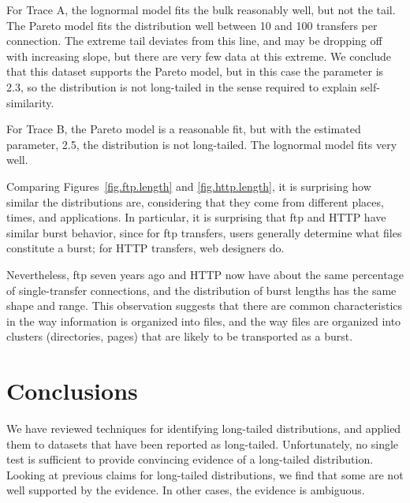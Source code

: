 \documentclass{elsart}
\begin{document}
For Trace A, the lognormal model fits the bulk
reasonably well, but not the tail.
The Pareto model fits the distribution well between 10
and 100 transfers per connection.  The extreme tail deviates from this
line, and may be dropping off with increasing slope, but there are
very few data at this extreme.  We conclude that this dataset
supports the Pareto model, but in this case the parameter is 2.3,
so the distribution is not long-tailed in the sense required to
explain self-similarity.


For Trace B, the Pareto model is a reasonable fit, but with the
estimated parameter, 2.5, the distribution is not long-tailed.
The lognormal model fits very well.

Comparing Figures~\ref{fig.ftp.length} and \ref{fig.http.length}, it
is surprising how similar the distributions are, considering that they
come from different places, times, and applications.  In particular,
it is surprising that ftp and HTTP have similar burst behavior, since
for ftp transfers, users generally determine what files constitute a
burst; for HTTP transfers, web designers do.

Nevertheless, ftp seven years ago and HTTP now have about the same
percentage of single-transfer connections, and the distribution of
burst lengths has the same shape and range.  This observation suggests
that there are common characteristics in the way information is
organized into files, and the way files are organized into clusters
(directories, pages) that are likely to be transported as a burst.


\section{Conclusions}
\label{conclusions}

We have reviewed techniques for identifying long-tailed distributions,
and applied them to datasets that have been reported as long-tailed.
Unfortunately, no single test is sufficient to provide convincing
evidence of a long-tailed distribution.  Looking at previous claims
for long-tailed distributions, we find that some are not well
supported by the evidence.  In other cases, the evidence is ambiguous.
\end{document}
